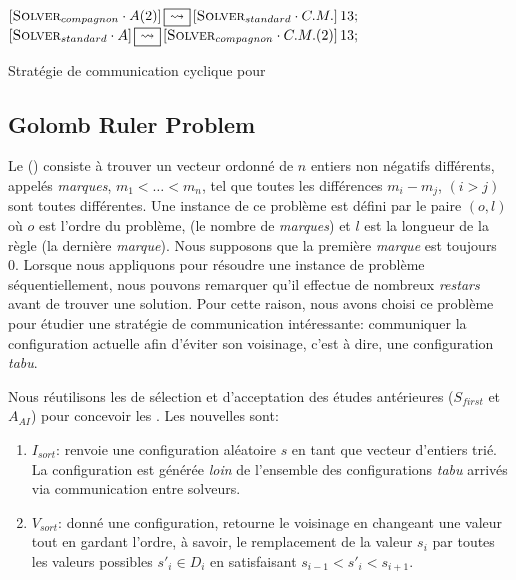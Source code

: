 
\begin{algorithm}[!h]
\dontprintsemicolon
\SetNoline
$\left[\eqsolverposl{compagnon}\cdot A(2)\right] \oneton \left[\eqsolverposl{standard}\cdot C.M.\right]13;$\;
$\left[\eqsolverposl{standard}\cdot A\right] \oneton \left[\eqsolverposl{compagnon}\cdot C.M.(2)\right]13;$
\caption{Stratégie de communication cyclique \oneTn{} pour \NQP}\label{comm:nqueens_cyc_1n}
\end{algorithm}







\subsection{Golomb Ruler Problem}

Le \grp{} (\GRP) consiste à trouver un vecteur ordonné de $n$ entiers non négatifs différents, appelés \textit{marques}, $m_1<\dots<m_n$, tel que toutes les différences $m_i- m_j$, $(i>j)$ sont toutes différentes. Une instance de ce problème est défini par le paire $(o,l)$ où $o$ est l'ordre du problème, (le nombre de \textit{marques}) et  $l$ est la longueur de la règle (la dernière {\it marque}). Nous supposons que la première \textit{marque} est toujours 0. Lorsque nous appliquons \posl{} pour résoudre une instance de problème séquentiellement, nous pouvons remarquer qu'il effectue de nombreux {\it restars} avant de trouver une solution. Pour cette raison, nous avons choisi ce problème pour étudier une stratégie de communication intéressante: communiquer la configuration actuelle afin d'éviter son voisinage, c'est à dire, une configuration {\it tabu}.

Nous réutilisons les \ms{} de sélection et d'acceptation des études antérieures ($S_{first}$ et$A_{AI}$) pour concevoir les \ass. Les nouvelles \ms{} sont:
\begin{enumerate}
\item $I_{sort}$: renvoie une configuration aléatoire $s$ en tant que vecteur d'entiers trié. La configuration est générée \textit{loin} de l'ensemble des configurations {\it tabu} arrivés via communication entre solveurs.
\item $V_{sort}$: donné une configuration, retourne le voisinage en changeant une valeur tout en gardant l'ordre, à savoir, le remplacement de la valeur $s_i$ par toutes les valeurs possibles $s'_i \in D_i$ en satisfaisant $s_{i-1}< s'_i < s_{i+1}$.
\end{enumerate}

